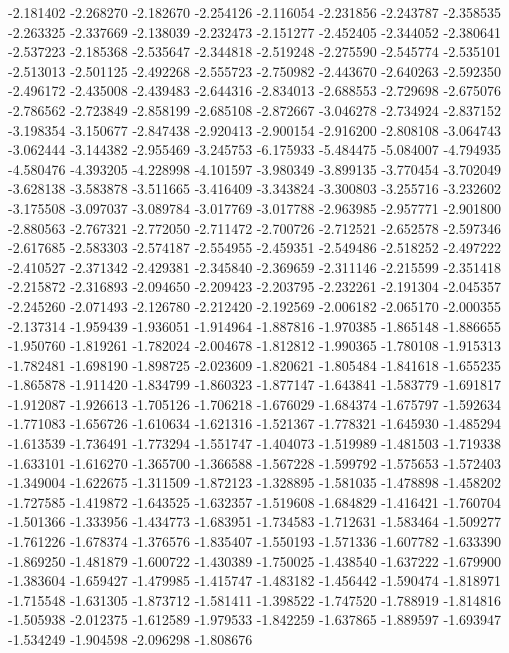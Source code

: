-2.181402
-2.268270
-2.182670
-2.254126
-2.116054
-2.231856
-2.243787
-2.358535
-2.263325
-2.337669
-2.138039
-2.232473
-2.151277
-2.452405
-2.344052
-2.380641
-2.537223
-2.185368
-2.535647
-2.344818
-2.519248
-2.275590
-2.545774
-2.535101
-2.513013
-2.501125
-2.492268
-2.555723
-2.750982
-2.443670
-2.640263
-2.592350
-2.496172
-2.435008
-2.439483
-2.644316
-2.834013
-2.688553
-2.729698
-2.675076
-2.786562
-2.723849
-2.858199
-2.685108
-2.872667
-3.046278
-2.734924
-2.837152
-3.198354
-3.150677
-2.847438
-2.920413
-2.900154
-2.916200
-2.808108
-3.064743
-3.062444
-3.144382
-2.955469
-3.245753
-6.175933
-5.484475
-5.084007
-4.794935
-4.580476
-4.393205
-4.228998
-4.101597
-3.980349
-3.899135
-3.770454
-3.702049
-3.628138
-3.583878
-3.511665
-3.416409
-3.343824
-3.300803
-3.255716
-3.232602
-3.175508
-3.097037
-3.089784
-3.017769
-3.017788
-2.963985
-2.957771
-2.901800
-2.880563
-2.767321
-2.772050
-2.711472
-2.700726
-2.712521
-2.652578
-2.597346
-2.617685
-2.583303
-2.574187
-2.554955
-2.459351
-2.549486
-2.518252
-2.497222
-2.410527
-2.371342
-2.429381
-2.345840
-2.369659
-2.311146
-2.215599
-2.351418
-2.215872
-2.316893
-2.094650
-2.209423
-2.203795
-2.232261
-2.191304
-2.045357
-2.245260
-2.071493
-2.126780
-2.212420
-2.192569
-2.006182
-2.065170
-2.000355
-2.137314
-1.959439
-1.936051
-1.914964
-1.887816
-1.970385
-1.865148
-1.886655
-1.950760
-1.819261
-1.782024
-2.004678
-1.812812
-1.990365
-1.780108
-1.915313
-1.782481
-1.698190
-1.898725
-2.023609
-1.820621
-1.805484
-1.841618
-1.655235
-1.865878
-1.911420
-1.834799
-1.860323
-1.877147
-1.643841
-1.583779
-1.691817
-1.912087
-1.926613
-1.705126
-1.706218
-1.676029
-1.684374
-1.675797
-1.592634
-1.771083
-1.656726
-1.610634
-1.621316
-1.521367
-1.778321
-1.645930
-1.485294
-1.613539
-1.736491
-1.773294
-1.551747
-1.404073
-1.519989
-1.481503
-1.719338
-1.633101
-1.616270
-1.365700
-1.366588
-1.567228
-1.599792
-1.575653
-1.572403
-1.349004
-1.622675
-1.311509
-1.872123
-1.328895
-1.581035
-1.478898
-1.458202
-1.727585
-1.419872
-1.643525
-1.632357
-1.519608
-1.684829
-1.416421
-1.760704
-1.501366
-1.333956
-1.434773
-1.683951
-1.734583
-1.712631
-1.583464
-1.509277
-1.761226
-1.678374
-1.376576
-1.835407
-1.550193
-1.571336
-1.607782
-1.633390
-1.869250
-1.481879
-1.600722
-1.430389
-1.750025
-1.438540
-1.637222
-1.679900
-1.383604
-1.659427
-1.479985
-1.415747
-1.483182
-1.456442
-1.590474
-1.818971
-1.715548
-1.631305
-1.873712
-1.581411
-1.398522
-1.747520
-1.788919
-1.814816
-1.505938
-2.012375
-1.612589
-1.979533
-1.842259
-1.637865
-1.889597
-1.693947
-1.534249
-1.904598
-2.096298
-1.808676

